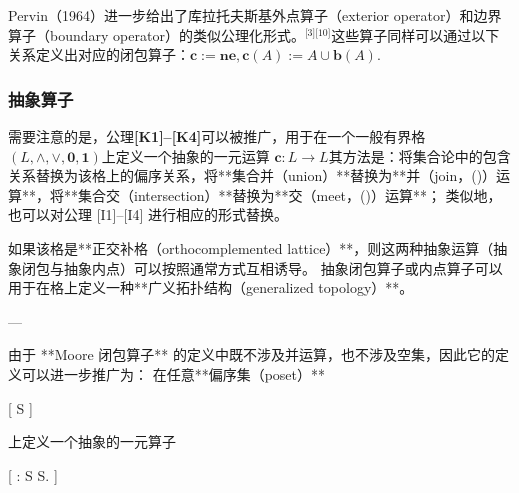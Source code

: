 Pervin（1964）进一步给出了库拉托夫斯基外点算子（exterior operator）和边界算子（boundary operator）的类似公理化形式。\(^\text{[3][10]}\)这些算子同样可以通过以下关系定义出对应的闭包算子：$\mathbf{c} := \mathbf{n e},\mathbf{c}(A) := A \cup \mathbf{b}(A)$.
\subsubsection{抽象算子}
需要注意的是，公理\textbf{[K1]–[K4]}可以被推广，用于在一个一般有界格
$(L, \land, \lor, \mathbf{0}, \mathbf{1})$上定义一个抽象的一元运算
$\mathbf{c} : L \to L$其方法是：将集合论中的包含关系替换为该格上的偏序关系，将**集合并（union）**替换为**并（join，(\lor)）运算**，将**集合交（intersection）**替换为**交（meet，(\land)）运算**；
类似地，也可以对公理 [I1]–[I4] 进行相应的形式替换。

如果该格是**正交补格（orthocomplemented lattice）**，则这两种抽象运算（抽象闭包与抽象内点）可以按照通常方式互相诱导。
抽象闭包算子或内点算子可以用于在格上定义一种**广义拓扑结构（generalized topology）**。

---

由于 **Moore 闭包算子** 的定义中既不涉及并运算，也不涉及空集，因此它的定义可以进一步推广为：
在任意**偏序集（poset）**

[
S
]

上定义一个抽象的一元算子

[
 : S \to S.
]
